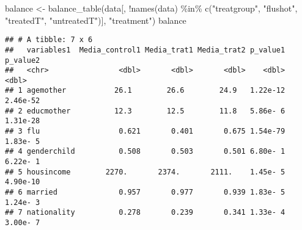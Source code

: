 \documentclass[
]{article}
\newenvironment{Shaded}{\begin{snugshade}}{\end{snugshade}}
\newcommand{\DecValTok}[1]{\textcolor[rgb]{0.00,0.00,0.81}{#1}}
\newcommand{\FunctionTok}[1]{\textcolor[rgb]{0.00,0.00,0.00}{#1}}
\newcommand{\NormalTok}[1]{#1}
\newcommand{\OtherTok}[1]{\textcolor[rgb]{0.56,0.35,0.01}{#1}}
\newcommand{\SpecialCharTok}[1]{\textcolor[rgb]{0.00,0.00,0.00}{#1}}
\newcommand{\StringTok}[1]{\textcolor[rgb]{0.31,0.60,0.02}{#1}}
\begin{document}
\begin{Shaded}
\end{Shaded}

\begin{Shaded}
\begin{Highlighting}[]
\NormalTok{balance }\OtherTok{\textless{}{-}} \FunctionTok{balance\_table}\NormalTok{(data[, }\SpecialCharTok{!}\FunctionTok{names}\NormalTok{(data) }\SpecialCharTok{\%in\%} \FunctionTok{c}\NormalTok{(}\StringTok{"treatgroup"}\NormalTok{, }\StringTok{"flushot"}\NormalTok{, }\StringTok{"treatedT"}\NormalTok{, }\StringTok{"untreatedT"}\NormalTok{)], }\StringTok{"treatment"}\NormalTok{)}
\NormalTok{balance}
\end{Highlighting}
\end{Shaded}

\begin{verbatim}
## # A tibble: 7 x 6
##   variables1  Media_control1 Media_trat1 Media_trat2 p_value1 p_value2
##   <chr>                <dbl>       <dbl>       <dbl>    <dbl>    <dbl>
## 1 agemother           26.1        26.6        24.9   1.22e-12 2.46e-52
## 2 educmother          12.3        12.5        11.8   5.86e- 6 1.31e-28
## 3 flu                  0.621       0.401       0.675 1.54e-79 1.83e- 5
## 4 genderchild          0.508       0.503       0.501 6.80e- 1 6.22e- 1
## 5 housincome        2270.       2374.       2111.    1.45e- 5 4.90e-10
## 6 married              0.957       0.977       0.939 1.83e- 5 1.24e- 3
## 7 nationality          0.278       0.239       0.341 1.33e- 4 3.00e- 7
\end{verbatim}
\end{document}
